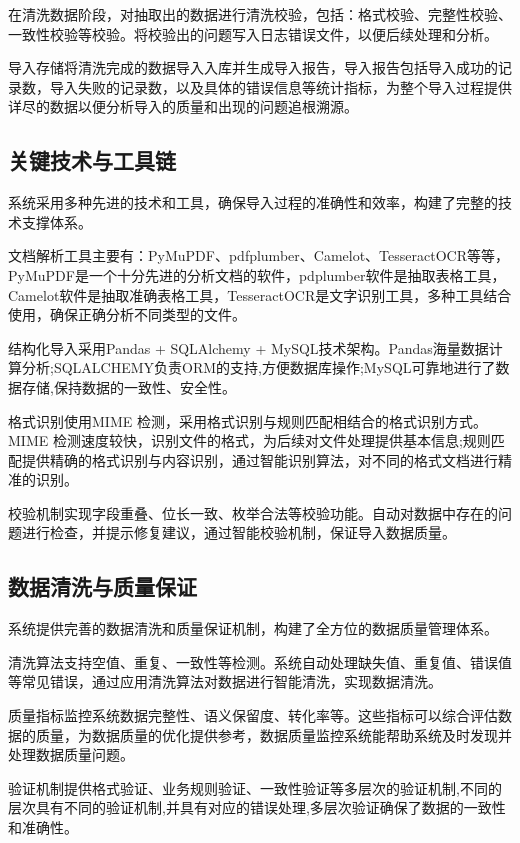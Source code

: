 在清洗数据阶段，对抽取出的数据进行清洗校验，包括：格式校验、完整性校验、一致性校验等校验。将校验出的问题写入日志错误文件，以便后续处理和分析。

导入存储将清洗完成的数据导入入库并生成导入报告，导入报告包括导入成功的记录数，导入失败的记录数，以及具体的错误信息等统计指标，为整个导入过程提供详尽的数据以便分析导入的质量和出现的问题追根溯源。

\subsection{关键技术与工具链}

系统采用多种先进的技术和工具，确保导入过程的准确性和效率，构建了完整的技术支撑体系。

文档解析工具主要有：PyMuPDF、pdfplumber、Camelot、TesseractOCR等等，PyMuPDF是一个十分先进的分析文档的软件，pdplumber软件是抽取表格工具，Camelot软件是抽取准确表格工具，TesseractOCR是文字识别工具，多种工具结合使用，确保正确分析不同类型的文件。

结构化导入采用Pandas + SQLAlchemy + MySQL技术架构。Pandas海量数据计算分析;SQLALCHEMY负责ORM的支持,方便数据库操作;MySQL可靠地进行了数据存储,保持数据的一致性、安全性。

格式识别使用MIME 检测，采用格式识别与规则匹配相结合的格式识别方式。MIME 检测速度较快，识别文件的格式，为后续对文件处理提供基本信息;规则匹配提供精确的格式识别与内容识别，通过智能识别算法，对不同的格式文档进行精准的识别。

校验机制实现字段重叠、位长一致、枚举合法等校验功能。自动对数据中存在的问题进行检查，并提示修复建议，通过智能校验机制，保证导入数据质量。


\subsection{数据清洗与质量保证}

系统提供完善的数据清洗和质量保证机制，构建了全方位的数据质量管理体系。

清洗算法支持空值、重复、一致性等检测。系统自动处理缺失值、重复值、错误值等常见错误，通过应用清洗算法对数据进行智能清洗，实现数据清洗。

质量指标监控系统数据完整性、语义保留度、转化率等。这些指标可以综合评估数据的质量，为数据质量的优化提供参考，数据质量监控系统能帮助系统及时发现并处理数据质量问题。

验证机制提供格式验证、业务规则验证、一致性验证等多层次的验证机制,不同的层次具有不同的验证机制,并具有对应的错误处理,多层次验证确保了数据的一致性和准确性。

